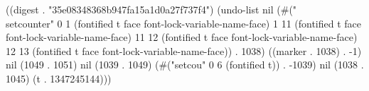 
((digest . "35e08348368b947fa15a1d0a27f737f4") (undo-list nil (#("\\setcounter{}" 0 1 (fontified t face font-lock-variable-name-face) 1 11 (fontified t face font-lock-variable-name-face) 11 12 (fontified t face font-lock-variable-name-face) 12 13 (fontified t face font-lock-variable-name-face)) . 1038) ((marker . 1038) . -1) nil (1049 . 1051) nil (1039 . 1049) (#("setcou" 0 6 (fontified t)) . -1039) nil (1038 . 1045) (t . 1347245144)))
